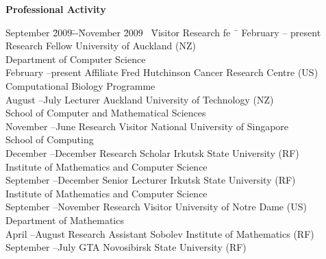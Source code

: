 \documentclass[12pt]{article}
\begin{document}
\centerline{\bf Professional Activity}
\begin{tabbing}
September \=2009\=--\=November \=2009 \ \= Visitor Research fe \ \= \kill
February \>--\> present \> \> Research Fellow \> University of Auckland (NZ)\\
                \>        \>   \>             \>          \>                          \> Department of Computer Science\\
February \>--\>present\>  \> Affiliate   \> Fred Hutchinson Cancer Research Centre (US)\\
                \>        \>   \>             \>          \>                          \> Computational Biology Programme \\
August \>--\>July \> Lecturer \> Auckland University of Technology (NZ)\\
                \>        \>   \>             \>          \>                          \> School of Computer and Mathematical Sciences\\
November       \>--\>June     \> Research Visitor \> National University of Singapore\\
\> \>\>\>          \>                                  \>School of Computing\\               
December \>--\>December  \> Research Scholar \> Irkutsk State University (RF)\\
                \>        \>   \>             \>          \>                          \>Institute of Mathematics and Computer Science\\
September \>--\>December  \> Senior Lecturer     \> Irkutsk State University (RF)\\
                \>        \>   \>             \>          \>                          \>Institute of Mathematics and Computer Science\\
September \>--\>November  \> Research Visitor   \> University of Notre Dame (US)\\
                \>        \>   \>             \>          \>                          \>Department of Mathematics \\
April           \>--\>August                   \> Research Assistant     \> Sobolev Institute of Mathematics (RF)\\
September \>--\>July                      \> GTA                          \> Novosibirsk State University (RF)\\
\end{tabbing}
\end{document}
